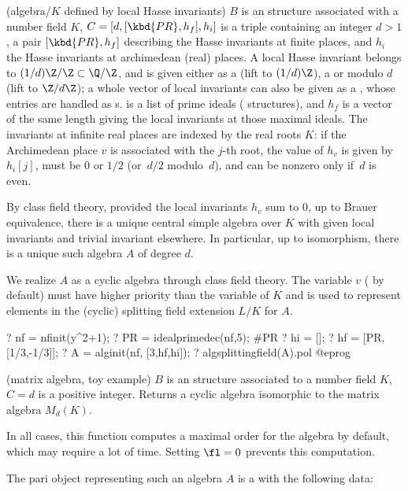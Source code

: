 \item (algebra/$K$ defined by local Hasse invariants)
$B$ is an  structure associated with a number field $K$,
$C = [d, [\kbd{PR},h_f], h_i]$ is a triple
containing an integer $d > 1$, a pair $[\kbd{PR}, h_f]$ describing the
Hasse invariants at finite places, and $h_i$ the Hasse invariants
at archimedean (real) places. A local Hasse invariant belongs to $(1/d)\Z/\Z
\subset \Q/\Z$, and is given either as a  (lift to $(1/d)\Z$),
a  or  modulo $d$ (lift to $\Z/d\Z$); a whole vector
of local invariants can also be given as a , whose
entries are handled as s.  is a list of prime ideals
( structures), and $h_f$ is a vector of the same length giving the
local invariants at those maximal ideals. The invariants at infinite real
places are indexed by the real roots $K$: if the Archimedean
place $v$ is associated with the $j$-th root, the value of
$h_v$ is given by $h_i[j]$, must be $0$ or $1/2$ (or~$d/2$ modulo~$d$), and
can be nonzero only if~$d$ is even.

By class field theory, provided the local invariants $h_v$ sum to $0$, up
to Brauer equivalence, there is a unique central simple algebra over $K$
with given local invariants and trivial invariant elsewhere. In particular,
up to isomorphism, there is a unique such algebra $A$ of degree $d$.

We realize $A$ as a cyclic algebra through class field theory. The variable $v$
( by default) must have higher priority than the variable of
$K$ and is used to represent elements in the (cyclic) splitting
field extension $L/K$ for $A$.

\bprog
 ? nf = nfinit(y^2+1);
 ? PR = idealprimedec(nf,5); #PR
 ? hi = [];
 ? hf = [PR, [1/3,-1/3]];
 ? A = alginit(nf, [3,hf,hi]);
 ? algsplittingfield(A).pol
@eprog

\item (matrix algebra, toy example) $B$ is an  structure associated
to a number field $K$, $C = d$ is a positive integer. Returns a cyclic
algebra isomorphic to the matrix algebra $M_d(K)$.

In all cases, this function computes a maximal order for the algebra by default,
which may require a lot of time. Setting $\fl = 0$ prevents this computation.

The pari object representing such an algebra $A$ is a  with the
following data:

